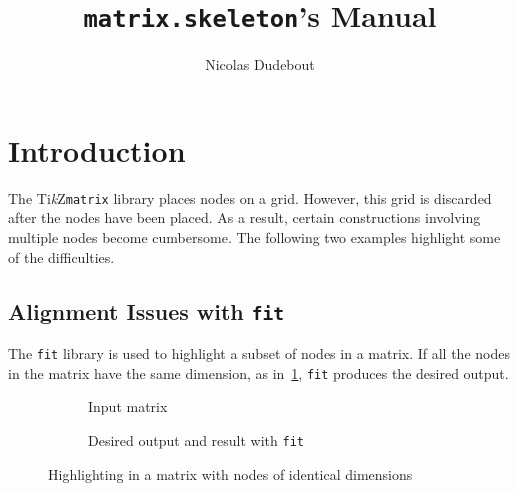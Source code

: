 \documentclass{scrartcl}
\title{\texttt{matrix.skeleton}'s Manual}
\author{Nicolas Dudebout}
\date{}
\newcommand\code\texttt
\newcommand{\TikZ}{Ti\textit{k}Z\xspace}
\begin{document}
\maketitle

\section{Introduction}

The \TikZ \code{matrix} library places nodes on a grid.
However, this grid is discarded after the nodes have been placed.
As a result, certain constructions involving multiple nodes become cumbersome.
The following two examples highlight some of the difficulties.

\subsection{Alignment Issues with \code{fit}}

The \code{fit} library is used to highlight a subset of nodes in a matrix.
If all the nodes in the matrix have the same dimension, as in~\cref{fig:highlighting_identical_dimensions}, \code{fit} produces the desired output.

\begin{figure}[h]
\centering

\begin{subfigure}{0.45\textwidth}
\centering
{}
\caption{Input matrix}
\end{subfigure}
%
\begin{subfigure}{0.45\textwidth}
\centering
{}
\caption{Desired output and result with \code{fit}}
\end{subfigure}

\caption{Highlighting in a matrix with nodes of identical dimensions}
\label{fig:highlighting_identical_dimensions}
\end{figure}
\end{document}
